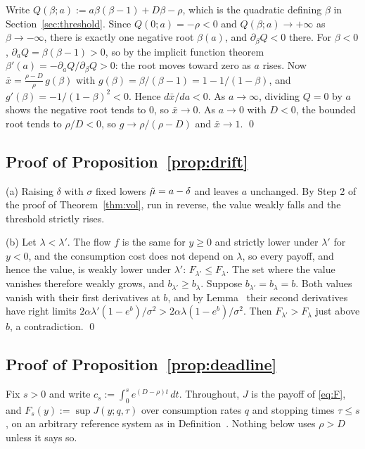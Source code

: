 Write $Q(\beta;a):=a\beta(\beta-1)+D\beta-\rho$, which is the quadratic defining $\beta$ in Section~\ref{sec:threshold}. Since $Q(0;a)=-\rho<0$ and $Q(\beta;a)\to+\infty$ as $\beta\to-\infty$, there is exactly one negative root $\beta(a)$, and $\partial_\beta Q<0$ there. For $\beta<0$, $\partial_aQ=\beta(\beta-1)>0$, so by the implicit function theorem $\beta'(a)=-\partial_aQ/\partial_\beta Q>0$: the root moves toward zero as $a$ rises. Now $\bar x=\frac{\rho-D}{\rho}\,g(\beta)$ with $g(\beta)=\beta/(\beta-1)=1-1/(1-\beta)$, and $g'(\beta)=-1/(1-\beta)^2<0$. Hence $d\bar x/da<0$. As $a\to\infty$, dividing $Q=0$ by $a$ shows the negative root tends to $0$, so $\bar x\to0$. As $a\to0$ with $D<0$, the bounded root tends to $\rho/D<0$, so $g\to\rho/(\rho-D)$ and $\bar x\to1$. \qed

\subsection*{Proof of Proposition~\ref{prop:drift}}

(a) Raising $\delta$ with $\sigma$ fixed lowers $\tilde\mu=a-\delta$ and leaves $a$ unchanged. By Step 2 of the proof of Theorem~\ref{thm:vol}, run in reverse, the value weakly falls and the threshold strictly rises.

(b) Let $\lambda<\lambda'$. The flow $f$ is the same for $y\ge0$ and strictly lower under $\lambda'$ for $y<0$, and the consumption cost does not depend on $\lambda$, so every payoff, and hence the value, is weakly lower under $\lambda'$: $F_{\lambda'}\le F_\lambda$. The set where the value vanishes therefore weakly grows, and $b_{\lambda'}\ge b_\lambda$. Suppose $b_{\lambda'}=b_\lambda=b$. Both values vanish with their first derivatives at $b$, and by Lemma~ their second derivatives have right limits $2\alpha\lambda'(1-e^b)/\sigma^2>2\alpha\lambda(1-e^b)/\sigma^2$. Then $F_{\lambda'}>F_\lambda$ just above $b$, a contradiction. \qed

\subsection*{Proof of Proposition~\ref{prop:deadline}}

Fix $s>0$ and write $c_s:=\int_0^se^{(D-\rho)t}\,dt$. Throughout, $J$ is the payoff of \eqref{eq:F}, and $F_s(y):=\sup J(y;q,\tau)$ over consumption rates $q$ and stopping times $\tau\le s$, on an arbitrary reference system as in Definition~. Nothing below uses $\rho>D$ unless it says so.

